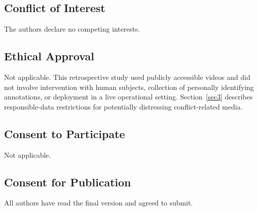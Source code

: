 \documentclass[pdflatex,sn-mathphys-num]{sn-jnl}
\theoremstyle{thmstyleone}
\theoremstyle{thmstyletwo}
\theoremstyle{thmstylethree}
\begin{document}
\subsection*{Conflict of Interest}
The authors declare no competing interests.

\subsection*{Ethical Approval}
Not applicable. This retrospective study used publicly accessible videos and did not involve intervention with human subjects, collection of personally identifying annotations, or deployment in a live operational setting. Section~\ref{sec3} describes responsible-data restrictions for potentially distressing conflict-related media.

\subsection*{Consent to Participate}
Not applicable.

\subsection*{Consent for Publication}
All authors have read the final version and agreed to submit.

\newpage

\end{document}
